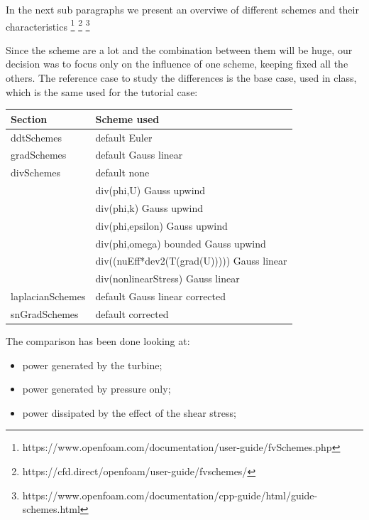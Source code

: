 \documentclass[a4paper,12pt]{article}
\newcommand{\foam}[1]{{\ttfamily #1}}
\begin{document}
In the next sub paragraphs we present an overviwe of different schemes and their characteristics \footnote{https://www.openfoam.com/documentation/user-guide/fvSchemes.php} \footnote{https://cfd.direct/openfoam/user-guide/fvschemes/} \footnote{https://www.openfoam.com/documentation/cpp-guide/html/guide-schemes.html}

Since the scheme are a lot and the combination between them will be huge, our decision was to focus only on the influence of one scheme, keeping fixed all the others. The reference case to study the differences is the base case, used in class, which is the same used for the tutorial case:
\begin{table}[H]
\begin{tabular}{ll}
\toprule
Section          & \foam{Scheme used }                               \\ \midrule
ddtSchemes       & \foam{default         Euler}                      \\
gradSchemes      & \foam{default         Gauss linear}               \\
divSchemes       & \foam{default         none}                       \\
                 & \foam{div(phi,U)      Gauss upwind}               \\
                 & \foam{div(phi,k)      Gauss upwind}              \\
                 & \foam{div(phi,epsilon) Gauss upwind}              \\
                 & \foam{div(phi,omega) bounded Gauss upwind}        \\
                 & \foam{div((nuEff*dev2(T(grad(U))))) Gauss linear} \\
                 & \foam{div(nonlinearStress) Gauss linear}          \\
laplacianSchemes & \foam{default         Gauss linear corrected}     \\
snGradSchemes    & \foam{default         corrected   }              \\ \bottomrule
\end{tabular}
\end{table}

The comparison has been done looking at:
\begin{itemize} 
 \item power generated by the turbine;
 \item power generated by pressure only;
 \item power dissipated by the effect of the shear stress;
 \end{itemize} 
\end{document}

